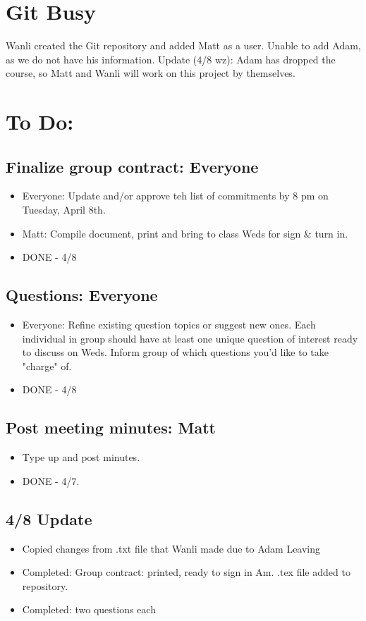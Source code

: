 \documentclass{article}
\begin{document}
\section{Git Busy}
Wanli created the Git repository and added Matt as a user.
Unable to add Adam, as we do not have his information.
Update (4/8 wz): Adam has dropped the course, so Matt and Wanli will work on this project by themselves.

\section{To Do:}
\subsection{Finalize group contract: Everyone}
\begin{itemize}
\item Everyone: Update and/or approve teh list of commitments by 8 pm on Tuesday, April 8th.
\item Matt: Compile document, print and bring to class Weds for sign \& turn in.
\item DONE - 4/8
\end{itemize}

\subsection{Questions: Everyone}
\begin{itemize}
\item Everyone: Refine existing question topics or suggest new ones. Each individual in group should have at least one unique question of interest ready to discuss on Weds. Inform group of which questions you'd like to take "charge" of.
\item DONE - 4/8
\end{itemize}

\subsection{Post meeting minutes: Matt}
\begin{itemize}
\item Type up and post minutes.
\item DONE - 4/7.
\end{itemize}

\subsection{4/8 Update}
\begin{itemize}
  \item Copied changes from .txt file that Wanli made due to Adam Leaving
  \item Completed: Group contract: printed, ready to sign in Am. .tex file added to repository.
  \item Completed: two questions each
\end{itemize}
\end{document}
